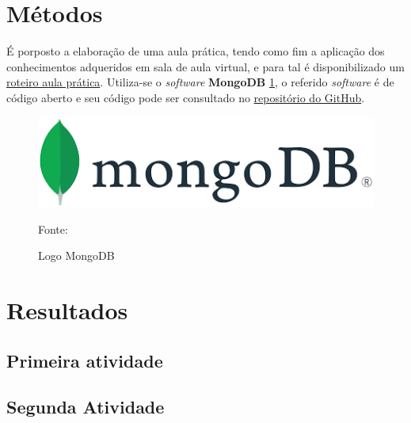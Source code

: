 \section{Métodos}

\par É porposto a elaboração de uma aula prática, tendo como fim a aplicação dos conhecimentos adqueridos em sala de aula virtual, e para tal é disponibilizado um \href{https://github.com/ENGENHARIA-DE-SOFTWARE-UNOPAR/NoSQL/blob/main/Roteiro-aula%20pratica.pdf}{roteiro aula prática}. Utiliza-se o \textit{software} \textbf{MongoDB} \ref{fig:logodb}, o referido \textit{software} é de código aberto e seu código pode ser consultado no \href{https://github.com/mongodb}{repositório do GitHub}.

\begin{figure}[H]
  \caption{Logo MongoDB}
  \includegraphics[scale=0.8]{figure/mongologo.png}
  \label{fig:logodb}

  {\fontsize{10pt}{\baselineskip}\selectfont
    Fonte: }
\end{figure}




\section{Resultados}
\subsection{Primeira atividade}\label{1atividade}

\subsection{Segunda Atividade}\label{2atividae}




